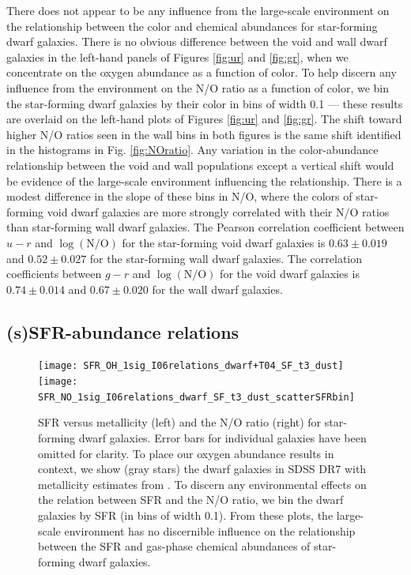 There does not appear to be any influence from the large-scale environment on 
the relationship between the color and chemical abundances for star-forming 
dwarf galaxies.  There is no obvious difference between the void and wall dwarf 
galaxies in the left-hand panels of Figures \ref{fig:ur} and \ref{fig:gr}, when 
we concentrate on the oxygen abundance as a function of color.  To help discern 
any influence from the environment on the N/O ratio as a function of color, we 
bin the star-forming dwarf galaxies by their color in bins of width 0.1 --- 
these results are overlaid on the left-hand plots of Figures \ref{fig:ur} and 
\ref{fig:gr}.  The shift toward higher N/O ratios seen in the wall bins in both 
figures is the same shift identified in the histograms in Fig. 
\ref{fig:NOratio}.  Any variation in the color-abundance relationship between 
the void and wall populations except a vertical shift would be evidence of the 
large-scale environment influencing the relationship.  There is a modest 
difference in the slope of these bins in N/O, where the colors of star-forming 
void dwarf galaxies are more strongly correlated with their N/O ratios than 
star-forming wall dwarf galaxies.  The Pearson correlation coefficient between 
$u-r$ and $\log (\text{N}/\text{O})$ for the star-forming void dwarf galaxies is 
$0.63\pm 0.019$ and $0.52\pm 0.027$ for the star-forming wall dwarf galaxies.  
The correlation coefficients between $g-r$ and $\log (\text{N}/\text{O})$ for 
the void dwarf galaxies is $0.74\pm 0.014$ and $0.67\pm 0.020$ for the wall 
dwarf galaxies.  


\subsection{(s)SFR-abundance relations}

\begin{figure}
    \centering
    \texttt{[image: SFR\_OH\_1sig\_I06relations\_dwarf+T04\_SF\_t3\_dust]}
    \texttt{[image: SFR\_NO\_1sig\_I06relations\_dwarf\_SF\_t3\_dust\_scatterSFRbin]}
    \caption{SFR versus metallicity (left) and the N/O ratio (right) for 
    star-forming dwarf galaxies.  Error bars for individual galaxies have been 
    omitted for clarity.  To place our oxygen abundance results in context, we 
    show (gray stars) the dwarf galaxies in SDSS DR7 with metallicity estimates 
    from \cite{Tremonti04}.  To discern any environmental effects on the 
    relation between SFR and the N/O ratio, we bin the dwarf galaxies by SFR (in 
    bins of width 0.1).  From these plots, the large-scale environment has no 
    discernible influence on the relationship between the SFR and gas-phase 
    chemical abundances of star-forming dwarf galaxies.}
    \label{fig:SFR}
\end{figure}

